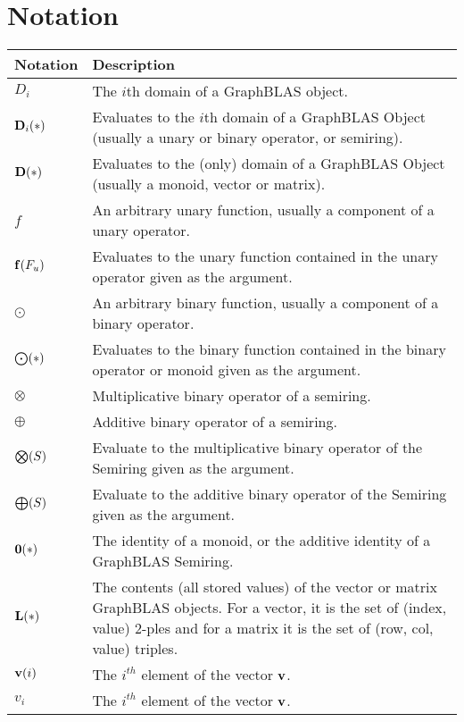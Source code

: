 \vfill


\section{Notation}

\begin{tabular}[H]{l|p{5in}}
Notation & Description \\
\hline
$D_i$           & The $i$th domain of a GraphBLAS object. \\
$\bold{D}_i(*)$ & Evaluates to the $i$th domain of a GraphBLAS Object (usually a unary or binary operator, or semiring). \\
$\bold{D}(*)$   & Evaluates to the (only) domain of a GraphBLAS Object (usually a monoid, vector or matrix). \\ 
$f$             & An arbitrary unary function, usually a component of a unary operator. \\
$\bold{f}(F_u)$ & Evaluates to the unary function contained in the unary operator given as the argument. \\
$\odot$         & An arbitrary binary function, usually a component of a binary operator. \\
$\bold{\bigodot}(*)$ & Evaluates to the binary function contained in the binary operator or monoid given as the argument. \\
$\otimes$       & Multiplicative binary operator of a semiring. \\
$\oplus$        & Additive binary operator of a semiring. \\
$\bold{\bigotimes}(S)$ & Evaluate to the multiplicative binary operator of the Semiring given as the argument. \\
$\bold{\bigoplus}(S)$ & Evaluate to the additive binary operator of the Semiring given as the argument. \\
$\bold{0}(*)$   & The identity of a monoid, or the additive identity of a GraphBLAS Semiring. \\
$\bold{L}(*)$   & The contents (all stored values) of the vector or matrix GraphBLAS objects.  For a vector, it is the set of (index, value) 2-ples and for a matrix it is the set of (row, col, value) triples. \\
$\bold{v}(i)$   & The $i^{th}$ element of the vector ${\bf v}$.\\
$v_i$           & The $i^{th}$ element of the vector ${\bf v}$.\\

\end{tabular}
